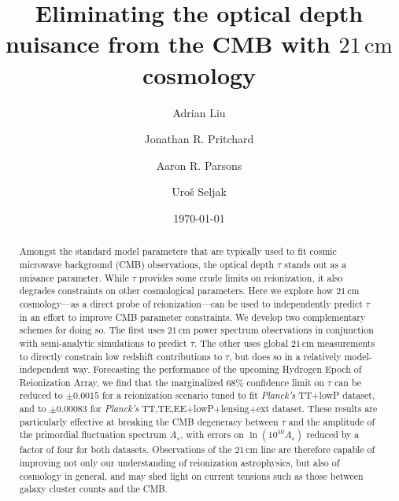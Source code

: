 \documentclass[twocolumn,aps,prd,nofootinbib,showpacs]{revtex4-1}
\begin{document}
\title{Eliminating the optical depth nuisance from the CMB with $21\,\textrm{cm}$ cosmology}


\author{Adrian Liu}

\author{Jonathan R. Pritchard}

\author{Aaron R. Parsons}

\author{Uro\v{s} Seljak}

\date{\today}





\begin{abstract}
Amongst the standard model parameters that are typically used to fit cosmic microwave background (CMB) observations, the optical depth $\tau$ stands out as a nuisance parameter. While $\tau$ provides some crude limits on reionization, it also degrades constraints on other cosmological parameters. Here we explore how $21\,\textrm{cm}$ cosmology---as a direct probe of reionization---can be used to independently predict $\tau$ in an effort to improve CMB parameter constraints. We develop two complementary schemes for doing so. The first uses $21\,\textrm{cm}$ power spectrum observations in conjunction with semi-analytic simulations to predict $\tau$. The other uses global $21\,\textrm{cm}$ measurements to directly constrain low redshift contributions to $\tau$, but does so in a relatively model-independent way. Forecasting the performance of the upcoming Hydrogen Epoch of Reionization Array, we find that the marginalized $68\%$ confidence limit on $\tau$ can be reduced to $\pm 0.0015$ for a reionization scenario tuned to fit \emph{Planck's} TT+lowP dataset, and to $\pm 0.00083$ for \emph{Planck's} TT,TE,EE+lowP+lensing+ext dataset. These results are particularly effective at breaking the CMB degeneracy between $\tau$ and the amplitude of the primordial fluctuation spectrum $A_s$, with errors on $\ln (10^{10} A_s)$ reduced by a factor of four for both datasets. Observations of the $21\,\textrm{cm}$ line are therefore capable of improving not only our understanding of reionization astrophysics, but also of cosmology in general, and may shed light on current tensions such as those between galaxy cluster counts and the CMB.
\end{abstract}
\end{document}
